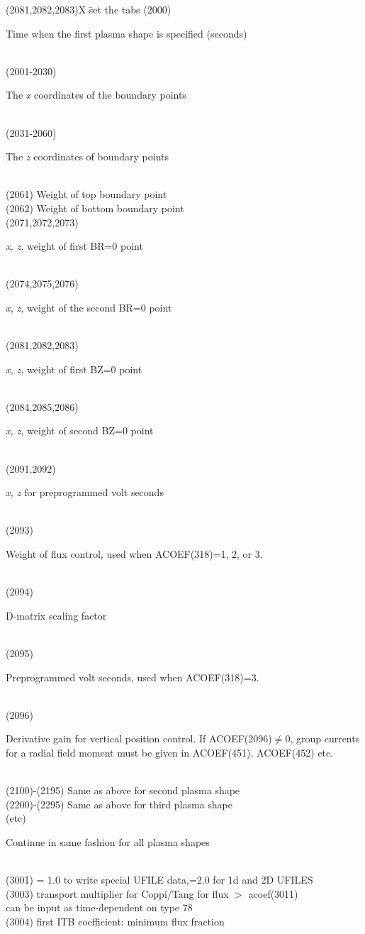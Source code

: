 \begin{tabbing}
(2081,2082,2083)X \= set the tabs \kill
(2000) \> \parbox[t]{\width}{Time when the first plasma shape is specified (seconds)}\\
(2001-2030) \> \parbox[t]{\width}{The {\em x} coordinates of the boundary points}\\
(2031-2060) \> \parbox[t]{\width}{The {\em z} coordinates of boundary points}\\
(2061) \> Weight of top boundary point\\
(2062) \> Weight of bottom boundary point\\
(2071,2072,2073) \> \parbox[t]{\width}{{\em x, z}, weight of first BR=0 point}\\
(2074,2075,2076) \> \parbox[t]{\width}{{\em x, z}, weight of the second BR=0 point}\\
(2081,2082,2083) \> \parbox[t]{\width}{{\em x, z}, weight of first BZ=0 point}\\
(2084,2085,2086) \> \parbox[t]{\width}{{\em x, z}, weight of second BZ=0 point}\\
(2091,2092) \> \parbox[t]{\width}{{\em x, z} for preprogrammed volt seconds}\\
(2093) \> \parbox[t]{\width}{Weight of flux control, used when ACOEF(318)=1, 2, or 3.}\\
(2094) \> \parbox[t]{\width}{D-matrix scaling factor}\\
(2095) \> \parbox[t]{\width}{Preprogrammed volt seconds, used when ACOEF(318)=3.}\\
(2096) \> \parbox[t]{\width}{Derivative gain for ver{\nolinebreak}tical \nolinebreak position
control. If ACOEF(2096)$\ne$0, group currents for a radial field moment must be given in
ACOEF(451), ACOEF(452) etc.}\\
(2100)-(2195) \> Same as above for second plasma shape\\
(2200)-(2295) \> Same as above for third plasma shape\\
(etc) \> \parbox[t]{\width}{Continue in same fashion for all plasma shapes} 
 \\
(3001) \> = 1.0 to write special UFILE data,=2.0 for 1d and 2D UFILES \\
(3003) \> transport multiplier for Coppi/Tang for flux $>$ acoef(3011) \\
       \> can be input as time-dependent on type 78 \\
(3004) \> first ITB coefficient:  minimum flux fraction \\

\end{tabbing}

